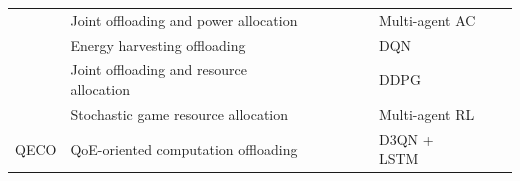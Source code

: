 \documentclass[12pt,draftclsnofoot,onecolumn]{IEEEtran}
\newcommand{\cmark}{\ding{51}}%
\newcommand{\xmark}{\ding{55}}%
\newenvironment{my}[2]%
{\begin{list}{}%
{\setlength{\rightmargin}{#1}\setlength{\leftmargin}{#2}}%


 \item[]{}

} {\end{list}}
\begin{document}
\begin{enumerate}
\begin{my}{1cm}{1cm}
{\begin{table}[tbp]
{{\begin{tabular}{ lp{6.7cm}p{1.2cm}p{1.2cm}p{1.2cm}p{1.4cm}p{4cm}p{5.8cm}l}
				\cite{wu2024privacy} &Joint offloading and power allocation & \centering\cmark &\centering\cmark& \centering\cmark&\centering\xmark& Multi-agent AC  &   \\  			 \cmidrule{1-7}
				\cite{Bolourian-WCL24} & Energy harvesting offloading & \centering\cmark &\centering\cmark& \centering\cmark&\centering\xmark& DQN&   \\  			 \cmidrule{1-7}
				\cite{chen2021drl} & Joint offloading and resource allocation& \centering\cmark &\centering\cmark& \centering\cmark&\centering\xmark& DDPG &   \\  			 \cmidrule{1-7}
				\cite{wu2023computation} &Stochastic game resource allocation & \centering\cmark &\centering\cmark&\centering\cmark& \centering\xmark& Multi-agent RL & &\vspace{1mm}  \\  										\toprule
				QECO & QoE-oriented computation offloading  & \centering\cmark &\centering\cmark& \centering\cmark&\centering\cmark& D3QN + LSTM &&\vspace{1mm} 	 		  \\
				\toprule
		\end{tabular}}
		\label{Com_works2}}
\end{table}

}
\end{my}
\end{enumerate}
\end{document}
